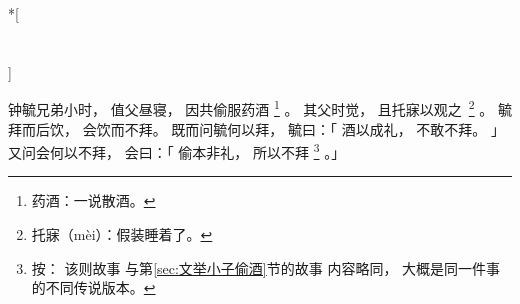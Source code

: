 
\switchcolumn[0]*[\section{}]

钟毓兄弟小时，
值父昼寝，
因共偷服药酒%
\footnote{%
    药酒：一说散酒。
}%
。
其父时觉，
且托寐以观\mbox{之%
\footnote{%
    托寐（mèi）：假装睡着了。
}}%
。
毓拜而后饮，
会饮而不拜。
既而问毓何以拜，
毓曰：「
    酒以成礼，
    不敢不拜。
」
又问会何以不拜，
会曰：「
    偷本非礼，
    所以不拜%
    \footnote{%
        按：
        该则故事
        与第\ref{sec:文举小子偷酒}节的故事
        内容略同，
        大概是同一件事的不同传说版本。
    }%
。」

\switchcolumn



